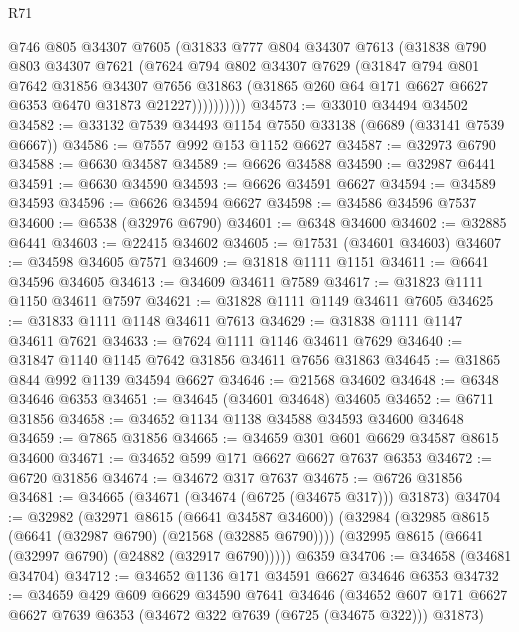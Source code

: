 \begin{lexlean}{R71}
\begin{coremodule}
              @746
              @805
              @34307
              @7605
              (@31833
                @777
                @804
                @34307
                @7613
                (@31838
                  @790
                  @803
                  @34307
                  @7621
                  (@7624
                    @794
                    @802
                    @34307
                    @7629
                    (@31847
                      @794
                      @801
                      @7642
                      @31856
                      @34307
                      @7656
                      @31863
                      (@31865 @260 @64 @171 @6627 @6627 @6353 @6470 @31873 @21227))))))))))
@34573 := @33010 @34494 @34502
@34582 := @33132 @7539 @34493 @1154 @7550 @33138 (@6689 (@33141 @7539 @6667))
@34586 := @7557 @992 @153 @1152 @6627
@34587 := @32973 @6790
@34588 := @6630 @34587
@34589 := @6626 @34588
@34590 := @32987 @6441
@34591 := @6630 @34590
@34593 := @6626 @34591 @6627
@34594 := @34589 @34593
@34596 := @6626 @34594 @6627
@34598 := @34586 @34596 @7537
@34600 := @6538 (@32976 @6790)
@34601 := @6348 @34600
@34602 := @32885 @6441
@34603 := @22415 @34602
@34605 := @17531 (@34601 @34603)
@34607 := @34598 @34605 @7571
@34609 := @31818 @1111 @1151
@34611 := @6641 @34596 @34605
@34613 := @34609 @34611 @7589
@34617 := @31823 @1111 @1150 @34611 @7597
@34621 := @31828 @1111 @1149 @34611 @7605
@34625 := @31833 @1111 @1148 @34611 @7613
@34629 := @31838 @1111 @1147 @34611 @7621
@34633 := @7624 @1111 @1146 @34611 @7629
@34640 := @31847 @1140 @1145 @7642 @31856 @34611 @7656 @31863
@34645 := @31865 @844 @992 @1139 @34594 @6627
@34646 := @21568 @34602
@34648 := @6348 @34646 @6353
@34651 := @34645 (@34601 @34648) @34605
@34652 := @6711 @31856
@34658 := @34652 @1134 @1138 @34588 @34593 @34600 @34648
@34659 := @7865 @31856
@34665 := @34659 @301 @601 @6629 @34587 @8615 @34600
@34671 := @34652 @599 @171 @6627 @6627 @7637 @6353
@34672 := @6720 @31856
@34674 := @34672 @317 @7637
@34675 := @6726 @31856
@34681 := @34665 (@34671 (@34674 (@6725 (@34675 @317))) @31873)
@34704 := @32982
    (@32971 @8615 (@6641 @34587 @34600))
    (@32984
      (@32985 @8615 (@6641 (@32987 @6790) (@21568 (@32885 @6790))))
      (@32995 @8615 (@6641 (@32997 @6790) (@24882 (@32917 @6790)))))
    @6359
@34706 := @34658 (@34681 @34704)
@34712 := @34652 @1136 @171 @34591 @6627 @34646 @6353
@34732 := @34659
    @429
    @609
    @6629
    @34590
    @7641
    @34646
    (@34652 @607 @171 @6627 @6627 @7639 @6353 (@34672 @322 @7639 (@6725 (@34675 @322))) @31873)

\end{coremodule}
\end{lexlean}

